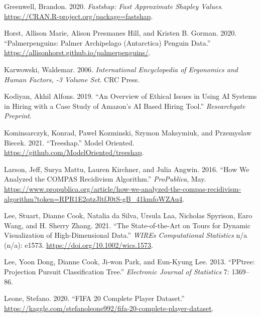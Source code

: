 \documentclass[
]{article}
\newlength{\cslhangindent}
\newlength{\cslentryspacingunit} %
\newenvironment{CSLReferences}[2] %
 {%
  \setlength{\parindent}{0pt}
  \ifodd #1
  \let\oldpar\par
  \def\par{\hangindent=\cslhangindent\oldpar}
  \fi
  \setlength{\parskip}{#2\cslentryspacingunit}
 }%
 {}
\begin{document}
\begin{CSLReferences}{1}{0}
\leavevmode{}%
Greenwell, Brandon. 2020. \emph{Fastshap: {Fast} {Approximate} {Shapley} {Values}}. \url{https://CRAN.R-project.org/package=fastshap}.

\leavevmode{}%
Horst, Allison Marie, Alison Presmanes Hill, and Kristen B. Gorman. 2020. {``Palmerpenguins: {Palmer} {Archipelago} ({Antarctica}) Penguin Data.''} \url{https://allisonhorst.github.io/palmerpenguins/}.

\leavevmode{}%
Karwowski, Waldemar. 2006. \emph{International {Encyclopedia} of {Ergonomics} and {Human} {Factors}, -3 {Volume} {Set}}. CRC Press.

\leavevmode{}%
Kodiyan, Akhil Alfons. 2019. {``An Overview of Ethical Issues in Using {AI} Systems in Hiring with a Case Study of {Amazon}'s {AI} Based Hiring Tool.''} \emph{Researchgate Preprint}.

\leavevmode{}%
Kominsarczyk, Konrad, Pawel Kozminski, Szymon Maksymiuk, and Przemyslaw Biecek. 2021. {``Treeshap.''} Model Oriented. \url{https://github.com/ModelOriented/treeshap}.

\leavevmode{}%
Larson, Jeff, Surya Mattu, Lauren Kirchner, and Julia Angwin. 2016. {``How {We} {Analyzed} the {COMPAS} {Recidivism} {Algorithm}.''} \emph{ProPublica}, May. \url{https://www.propublica.org/article/how-we-analyzed-the-compas-recidivism-algorithm?token=RPR1E2qtzJltfJ0tS-gB_41kmfoWZAu4}.

\leavevmode{}%
Lee, Stuart, Dianne Cook, Natalia da Silva, Ursula Laa, Nicholas Spyrison, Earo Wang, and H. Sherry Zhang. 2021. {``The State-of-the-Art on Tours for Dynamic Visualization of High-Dimensional Data.''} \emph{WIREs Computational Statistics} n/a (n/a): e1573. \url{https://doi.org/10.1002/wics.1573}.

\leavevmode{}%
Lee, Yoon Dong, Dianne Cook, Ji-won Park, and Eun-Kyung Lee. 2013. {``{PPtree}: {Projection} Pursuit Classification Tree.''} \emph{Electronic Journal of Statistics} 7: 1369--86.

\leavevmode{}%
Leone, Stefano. 2020. {``{FIFA} 20 Complete Player Dataset.''} \url{https://kaggle.com/stefanoleone992/fifa-20-complete-player-dataset}.


\end{CSLReferences}
\end{document}
